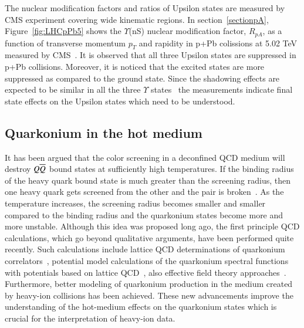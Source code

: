 The nuclear modification factors and ratios of Upsilon states are measured by CMS
experiment covering wide kinematic regions.
In section~\ref{sectionpA}, Figure~\ref{fig:LHCpPb5} shows the $\Upsilon$(nS) nuclear
modification factor, $R_{pA}$,  as a function of transverse momentum $p_{T}$ 
and rapidity in p+Pb colissions at 5.02 TeV measured by CMS~\cite{CMS:2022wfi}.
It is observed that all three Upsilon states are suppressed in p+Pb collisions.
Moreover, it is noticed that the excited states are more suppressed as compared
to the ground state. Since the shadowing effects are expected to be similar
in all the three $\Upsilon$ states~\cite{Vogt:2015uba}
the measurements indicate final state effects on the Upsilon states which need
to be understood. 


\subsection{Quarkonium in the hot medium}
\label{sec:media_sec3}

It has been argued that the color screening 
in a deconfined QCD medium will destroy $Q \overline{Q}$ bound states
at sufficiently high temperatures. If the binding radius of the heavy
quark bound state is  much greater than the screening radius, then one heavy 
quark gets screened from the other and the pair is broken~\cite{Abdulsalam:2012bw}.
As the temperature 
increases, the screening radius becomes smaller and smaller compared to the 
binding radius and the quarkonium states become more and more unstable. 
Although this idea was proposed long ago, the first principle QCD calculations, 
which go beyond qualitative arguments, have been performed quite recently. 
Such calculations include lattice QCD determinations of quarkonium 
correlators~\cite{Umeda:2002vr,Asakawa:2003re,Datta:2003ww,Jakovac:2006sf,Aarts:2007pk},
potential model calculations 
of the quarkonium spectral functions with potentials based on lattice 
QCD~\cite{Digal:2001ue,Wong:2004zr,Mocsy:2005qw,Mocsy:2004bv,Alberico:2006vw,Cabrera:2006wh,Mocsy:2007yj,Mocsy:2007jz},
also effective field theory
approaches~\cite{Laine:2007qy,Laine:2007gj,Laine:2008cf,Brambilla:2008cx}.  
Furthermore, better modeling of 
quarkonium production in the medium created by heavy-ion collisions has 
been achieved. These new advancements improve the understanding of 
the hot-medium effects on the quarkonium states which is crucial for the 
interpretation of heavy-ion data. 



